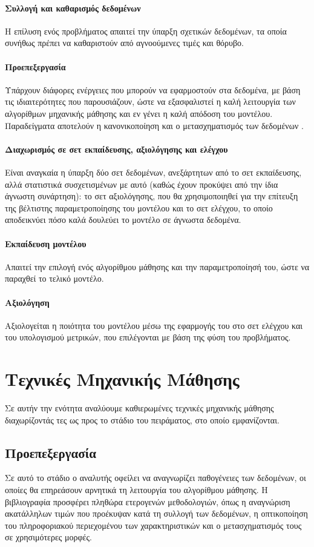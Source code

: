 \begin{minipage}{0.48\textwidth}
	\paragraph{Συλλογή και καθαρισμός δεδομένων} Η επίλυση ενός προβλήματος απαιτεί την ύπαρξη σχετικών δεδομένων, τα οποία συνήθως πρέπει να καθαριστούν από αγνοούμενες τιμές και θόρυβο. 
	\paragraph{Προεπεξεργασία} Υπάρχουν διάφορες ενέργειες που μπορούν να εφαρμοστούν στα δεδομένα, με βάση τις ιδιαιτερότητες που παρουσιάζουν, ώστε να εξασφαλιστεί η καλή λειτουργία των αλγορίθμων μηχανικής μάθησης και εν γένει η καλή απόδοση του μοντέλου. Παραδείγματα αποτελούν η κανονικοποίηση και ο μετασχηματισμός των δεδομένων .
	\paragraph{Διαχωρισμός σε σετ εκπαίδευσης, αξιολόγησης και ελέγχου} Είναι αναγκαία η ύπαρξη δύο σετ δεδομένων, ανεξάρτητων από το σετ εκπαίδευσης, αλλά στατιστικά συσχετισμένων με αυτό (καθώς έχουν προκύψει από την ίδια άγνωστη συνάρτηση): το σετ αξιολόγησης, που θα χρησιμοποιηθεί για την επίτευξη της βέλτιστης παραμετροποίησης του μοντέλου  και το σετ ελέγχου, το οποίο αποδεικνύει πόσο καλά δουλεύει το μοντέλο σε άγνωστα δεδομένα.
    \paragraph{Εκπαίδευση μοντέλου} Απαιτεί την επιλογή ενός αλγορίθμου μάθησης και την παραμετροποίησή του, ώστε να παραχθεί το τελικό μοντέλο.
	\paragraph{Αξιολόγηση} Αξιολογείται η ποιότητα του μοντέλου μέσω της εφαρμογής του στο σετ ελέγχου και του υπολογισμού μετρικών, που επιλέγονται με βάση της φύση του προβλήματος.
\end{minipage}
\section{Τεχνικές Μηχανικής Μάθησης}
Σε αυτήν την ενότητα αναλύουμε καθιερωμένες τεχνικές μηχανικής μάθησης διαχωρίζοντάς τες ως προς το στάδιο του πειράματος, στο οποίο εμφανίζονται.
\subsection{Προεπεξεργασία} Σε αυτό το στάδιο ο αναλυτής οφείλει να αναγνωρίζει παθογένειες των δεδομένων, οι οποίες θα επηρεάσουν αρνητικά τη λειτουργία του αλγορίθμου μάθησης. Η βιβλιογραφία προσφέρει πληθώρα ετερογενών μεθοδολογιών, όπως η αναγνώριση ακατάλληλων τιμών που προέκυψαν κατά τη συλλογή των δεδομένων, η οπτικοποίηση του πληροφοριακού περιεχομένου των χαρακτηριστικών και ο μετασχηματισμός τους σε χρησιμότερες μορφές.  

